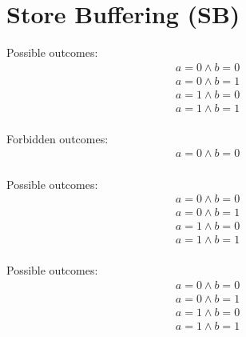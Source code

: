 \section{Store Buffering (SB)}
\label{app:sb}

%
\begin{minipage}[t]{0.3\linewidth}
Possible outcomes:\\
\[\begin{array}{l}
a = 0 \land b = 0\\
a = 0 \land b = 1\\
a = 1 \land b = 0\\
a = 1 \land b = 1\\
\end{array}\]
\end{minipage}
%
\sbTemplate{\rel}{\rel}{\rel}{\acq}{\rel}{\acq}
\litmusTestEnd


\begin{minipage}[t]{0.3\linewidth}
Forbidden outcomes:\\
\[\begin{array}{l}
a = 0 \land b = 0\\
\end{array}\]
\end{minipage}
%
\sbTemplate{\sco}{\sco}{\sco}{\sco}{\sco}{\sco}
\litmusTestEnd

\begin{minipage}[t]{0.3\linewidth}
Possible outcomes:\\
\[\begin{array}{l}
a = 0 \land b = 0\\
a = 0 \land b = 1\\
a = 1 \land b = 0\\
a = 1 \land b = 1\\
\end{array}\]
\end{minipage}
%
\sbTemplate{\sco}{\sco}{\rel}{\sco}{\sco}{\sco}
\litmusTestEnd

\begin{minipage}[t]{0.3\linewidth}
Possible outcomes:\\
\[\begin{array}{l}
a = 0 \land b = 0\\
a = 0 \land b = 1\\
a = 1 \land b = 0\\
a = 1 \land b = 1\\
\end{array}\]
\end{minipage}
%
\sbTemplate{\sco}{\sco}{\sco}{\acq}{\sco}{\sco}
\litmusTestEnd

